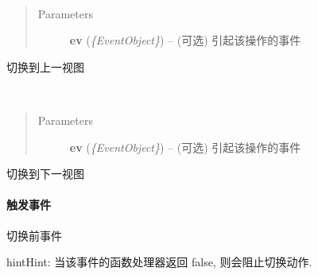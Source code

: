 \documentclass[letterpaper,10pt,english]{sphinxmanual}
\begin{document}

\begin{fulllineitems}
\label{api/component/switchable/switchable:Switchable.Switchable.prev}~\begin{quote}\begin{description}
\item[{Parameters}] \leavevmode
\textbf{ev} (\emph{\{EventObject\}}) -- (可选) 引起该操作的事件

\end{description}\end{quote}

切换到上一视图

\end{fulllineitems}



\begin{fulllineitems}
\label{api/component/switchable/switchable:Switchable.Switchable.next}~\begin{quote}\begin{description}
\item[{Parameters}] \leavevmode
\textbf{ev} (\emph{\{EventObject\}}) -- (可选) 引起该操作的事件

\end{description}\end{quote}

切换到下一视图

\end{fulllineitems}



\paragraph{触发事件}
\label{api/component/switchable/switchable:id5}

\begin{fulllineitems}
\label{api/component/switchable/switchable:Switchable.Switchable.beforeSwitch}
切换前事件

\begin{notice}{hint}{Hint:}
当该事件的函数处理器返回 false,  则会阻止切换动作.
\end{notice}

\end{fulllineitems}
\end{document}
